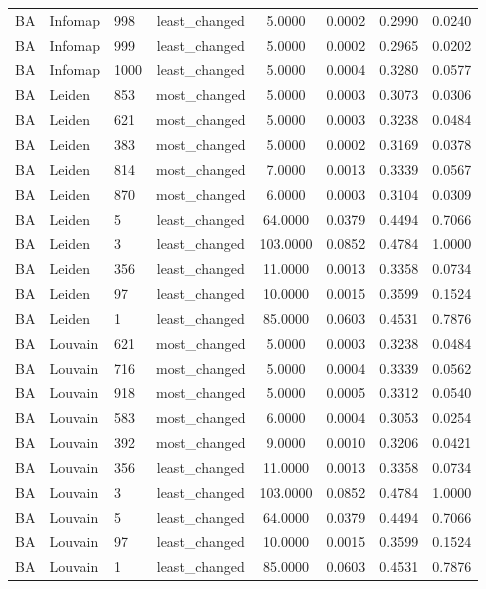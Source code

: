 \begin{longtable}{lllccccc}
BA & Infomap & 998 & least\_changed & 5.0000 & 0.0002 & 0.2990 & 0.0240 \\
BA & Infomap & 999 & least\_changed & 5.0000 & 0.0002 & 0.2965 & 0.0202 \\
BA & Infomap & 1000 & least\_changed & 5.0000 & 0.0004 & 0.3280 & 0.0577 \\
BA & Leiden & 853 & most\_changed & 5.0000 & 0.0003 & 0.3073 & 0.0306 \\
BA & Leiden & 621 & most\_changed & 5.0000 & 0.0003 & 0.3238 & 0.0484 \\
BA & Leiden & 383 & most\_changed & 5.0000 & 0.0002 & 0.3169 & 0.0378 \\
BA & Leiden & 814 & most\_changed & 7.0000 & 0.0013 & 0.3339 & 0.0567 \\
BA & Leiden & 870 & most\_changed & 6.0000 & 0.0003 & 0.3104 & 0.0309 \\
BA & Leiden & 5 & least\_changed & 64.0000 & 0.0379 & 0.4494 & 0.7066 \\
BA & Leiden & 3 & least\_changed & 103.0000 & 0.0852 & 0.4784 & 1.0000 \\
BA & Leiden & 356 & least\_changed & 11.0000 & 0.0013 & 0.3358 & 0.0734 \\
BA & Leiden & 97 & least\_changed & 10.0000 & 0.0015 & 0.3599 & 0.1524 \\
BA & Leiden & 1 & least\_changed & 85.0000 & 0.0603 & 0.4531 & 0.7876 \\
BA & Louvain & 621 & most\_changed & 5.0000 & 0.0003 & 0.3238 & 0.0484 \\
BA & Louvain & 716 & most\_changed & 5.0000 & 0.0004 & 0.3339 & 0.0562 \\
BA & Louvain & 918 & most\_changed & 5.0000 & 0.0005 & 0.3312 & 0.0540 \\
BA & Louvain & 583 & most\_changed & 6.0000 & 0.0004 & 0.3053 & 0.0254 \\
BA & Louvain & 392 & most\_changed & 9.0000 & 0.0010 & 0.3206 & 0.0421 \\
BA & Louvain & 356 & least\_changed & 11.0000 & 0.0013 & 0.3358 & 0.0734 \\
BA & Louvain & 3 & least\_changed & 103.0000 & 0.0852 & 0.4784 & 1.0000 \\
BA & Louvain & 5 & least\_changed & 64.0000 & 0.0379 & 0.4494 & 0.7066 \\
BA & Louvain & 97 & least\_changed & 10.0000 & 0.0015 & 0.3599 & 0.1524 \\
BA & Louvain & 1 & least\_changed & 85.0000 & 0.0603 & 0.4531 & 0.7876 \\

\end{longtable}
